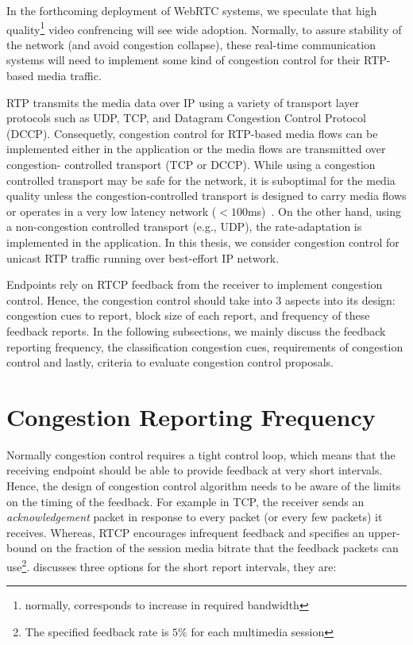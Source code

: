 In the forthcoming deployment of WebRTC systems, we speculate that high
quality\footnote{normally, corresponds to increase in required bandwidth}
video confrencing will see wide adoption. Normally, to assure stability of the
network (and avoid congestion collapse), these real-time communication systems
will need to implement some kind of congestion control for their RTP-based
media traffic.

RTP transmits the media data over IP using a variety of transport layer
protocols such as UDP, TCP, and Datagram Congestion Control Protocol (DCCP).
Consequetly, congestion control for RTP-based media flows can be implemented
either in the application or the media flows are transmitted over congestion-%
controlled transport (TCP or DCCP). While using a congestion controlled
transport may be safe for the network, it is suboptimal for the media quality
unless the congestion-controlled transport is designed to carry media flows or
operates in a very low latency network ($<100$ms)~\cite{Brosh:tcp-real-time}.
On the other hand, using a non-congestion controlled transport (e.g., UDP),
the rate-adaptation is implemented in the application.  In this thesis, we
consider congestion control for unicast RTP traffic running over best-effort
IP network.


Endpoints rely on RTCP feedback from the receiver to implement congestion
control. Hence, the congestion control should take into 3 aspects into its
design: congestion cues to report, block size of each report, and frequency of
these feedback reports. In the following subsections, we mainly discuss the
feedback reporting frequency, the classification congestion cues, requirements
of congestion control and lastly, criteria to evaluate congestion control
proposals.

\section{Congestion Reporting Frequency}

Normally congestion control requires a tight control loop, which means that
the receiving endpoint should be able to provide feedback at very short
intervals. Hence, the design of congestion control algorithm needs to be aware
of the limits on the timing of the feedback.  For example in TCP, the receiver
sends an \emph{acknowledgement} packet in response to every packet (or every
few packets) it receives. Whereas, RTCP encourages infrequent feedback and
specifies an upper-bound on the fraction of the session media bitrate that the
feedback packets can use\footnote{The specified feedback rate is $5\%$ for
each multimedia session}.  \cite{draft.rmcat.feedback} discusses three options
for the short report intervals, they are:

